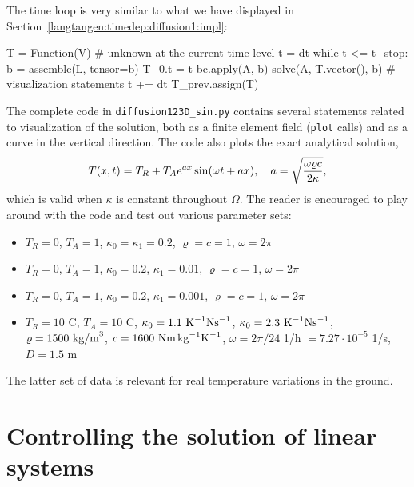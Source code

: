 The time loop is very similar to what we have displayed in
Section~\ref{langtangen:timedep:diffusion1:impl}:
\begin{python}
T = Function(V)   # unknown at the current time level
t = dt
while t <= t_stop:
    b = assemble(L, tensor=b)
    T_0.t = t
    bc.apply(A, b)
    solve(A, T.vector(), b)
    # visualization statements
    t += dt
    T_prev.assign(T)
\end{python}
The complete code in {\fontsize{10pt}{10pt}\verb!diffusion123D_sin.py!} contains several
statements related to visualization of the solution, both as a
finite element field ({\fontsize{10pt}{10pt}\texttt{plot}} calls) and as a curve in the
vertical direction. The code also plots the exact analytical solution,
\[
T(x,t) = T_R + T_Ae^{ax}\sin (\omega t + ax),\quad a =\sqrt{\omega\varrho c\over 2\kappa},
\]
which is valid when $\kappa$ is constant throughout $\Omega$. 
The reader is encouraged
to play around with the code and test out various parameter sets:
\begin{itemize}
\item $T_R=0$, $T_A=1$, $\kappa_0 = \kappa_1=0.2$, $\varrho = c = 1$, $\omega = 2\pi$
\item $T_R=0$, $T_A=1$, $\kappa_0=0.2$, $\kappa_1=0.01$, $\varrho = c = 1$, $\omega = 2\pi$
\item $T_R=0$, $T_A=1$, $\kappa_0=0.2$, $\kappa_1=0.001$, $\varrho = c = 1$, $\omega = 2\pi$
\item $T_R=10$ C, $T_A=10$ C, $\kappa_0= 1.1 \hbox{ K}^{-1}\hbox{Ns}^{-1}$,
$\kappa_0= 2.3 \hbox{ K}^{-1}\hbox{Ns}^{-1}$, 
$\varrho = 1500\hbox{ kg/m}^3$, 
$c = 1600\hbox{ Nm\,kg}^{-1}\hbox{K}^{-1}$, 
$\omega = 2\pi/24$ 1/h  $= 7.27\cdot 10^{-5}$ 1/s, $D=1.5$ m
\end{itemize}
The latter set of data is relevant for real temperature variations in the
ground.


\section{Controlling the solution of linear systems}
\label{langtangen:linsys}
\label{linear algebra backends}
\label{linear solver choice}
\label{preconditioner choice}

